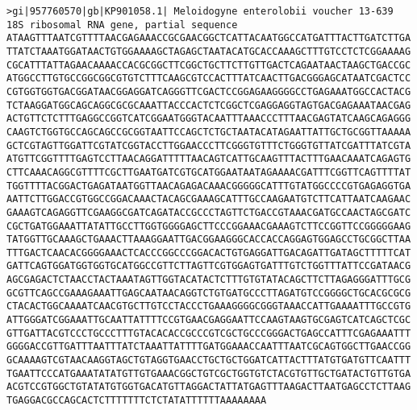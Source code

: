 \documentclass[11pt]{article}
\begin{document}
\begin{Verbatim}[commandchars=\\\{\}]
>gi|957760570|gb|KP901058.1| Meloidogyne enterolobii voucher 13-639 18S ribosomal RNA gene, partial sequence
ATAAGTTTAATCGTTTTAACGAGAAACCGCGAACGGCTCATTACAATGGCCATGATTTACTTGATCTTGA
TTATCTAAATGGATAACTGTGGAAAAGCTAGAGCTAATACATGCACCAAAGCTTTGTCCTCTCGGAAAAG
CGCATTTATTAGAACAAAACCACGCGGCTTCGGCTGCTTCTTGTTGACTCAGAATAACTAAGCTGACCGC
ATGGCCTTGTGCCGGCGGCGTGTCTTTCAAGCGTCCACTTTATCAACTTGACGGGAGCATAATCGACTCC
CGTGGTGGTGACGGATAACGGAGGATCAGGGTTCGACTCCGGAGAAGGGGCCTGAGAAATGGCCACTACG
TCTAAGGATGGCAGCAGGCGCGCAAATTACCCACTCTCGGCTCGAGGAGGTAGTGACGAGAAATAACGAG
ACTGTTCTCTTTGAGGCCGGTCATCGGAATGGGTACAATTTAAACCCTTTAACGAGTATCAAGCAGAGGG
CAAGTCTGGTGCCAGCAGCCGCGGTAATTCCAGCTCTGCTAATACATAGAATTATTGCTGCGGTTAAAAA
GCTCGTAGTTGGATTCGTATCGGTACCTTGGAACCCTTCGGGTGTTTCTGGGTGTTATCGATTTATCGTA
ATGTTCGGTTTTGAGTCCTTAACAGGATTTTTAACAGTCATTGCAAGTTTACTTTGAACAAATCAGAGTG
CTTCAAACAGGCGTTTTCGCTTGAATGATCGTGCATGGAATAATAGAAAACGATTTCGGTTCAGTTTTAT
TGGTTTTACGGACTGAGATAATGGTTAACAGAGACAAACGGGGGCATTTGTATGGCCCCGTGAGAGGTGA
AATTCTTGGACCGTGGCCGGACAAACTACAGCGAAAGCATTTGCCAAGAATGTCTTCATTAATCAAGAAC
GAAAGTCAGAGGTTCGAAGGCGATCAGATACCGCCCTAGTTCTGACCGTAAACGATGCCAACTAGCGATC
CGCTGATGGAAATTATATTGCCTTGGTGGGGAGCTTCCCGGAAACGAAAGTCTTCCGGTTCCGGGGGAAG
TATGGTTGCAAAGCTGAAACTTAAAGGAATTGACGGAAGGGCACCACCAGGAGTGGAGCCTGCGGCTTAA
TTTGACTCAACACGGGGAAACTCACCCGGCCCGGACACTGTGAGGATTGACAGATTGATAGCTTTTTCAT
GATTCAGTGGATGGTGGTGCATGGCCGTTCTTAGTTCGTGGAGTGATTTGTCTGGTTTATTCCGATAACG
AGCGAGACTCTAACCTACTAAATAGTTGGTACATACTCTTTGTGTATACAGCTTCTTAGAGGGATTTGCG
GCGTTCAGCCGAAAGAAATTGAGCAATAACAGGTCTGTGATGCCCTTAGATGTCCGGGGCTGCACGCGCG
CTACACTGGCAAAATCAACGTGCTTGTCCTACCCTGAAAGGGGCGGGTAAACCATTGAAAATTTGCCGTG
ATTGGGATCGGAAATTGCAATTATTTTCCGTGAACGAGGAATTCCAAGTAAGTGCGAGTCATCAGCTCGC
GTTGATTACGTCCCTGCCCTTTGTACACACCGCCCGTCGCTGCCCGGGACTGAGCCATTTCGAGAAATTT
GGGGACCGTTGATTTAATTTATCTAAATTATTTTGATGGAAACCAATTTAATCGCAGTGGCTTGAACCGG
GCAAAAGTCGTAACAAGGTAGCTGTAGGTGAACCTGCTGCTGGATCATTACTTTATGTGATGTTCAATTT
TGAATTCCCATGAAATATATGTTGTGAAACGGCTGTCGCTGGTGTCTACGTGTTGCTGATACTGTTGTGA
ACGTCCGTGGCTGTATATGTGGTGACATGTTAGGACTATTATGAGTTTAAGACTTAATGAGCCTCTTAAG
TGAGGACGCCAGCACTCTTTTTTTCTCTATATTTTTTAAAAAAAA


\end{Verbatim}
\end{document}
